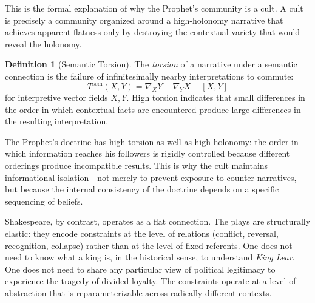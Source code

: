 \documentclass[12pt, oneside]{article}
\theoremstyle{plain}
\theoremstyle{definition}
\newtheorem{definition}[theorem]{Definition}
\theoremstyle{remark}
\begin{document}
This is the formal explanation of why the Prophet's community is a
cult. A cult is precisely a community organized around a high-holonomy
narrative that achieves apparent flatness only by destroying the
contextual variety that would reveal the holonomy.

\begin{definition}[Semantic Torsion]
The \emph{torsion} of a narrative under a semantic connection is the
failure of infinitesimally nearby interpretations to commute:
\[
  T^{\mathrm{sem}}(X, Y) = \nabla_X Y - \nabla_Y X - [X, Y]
\]
for interpretive vector fields $X, Y$. High torsion indicates that
small differences in the order in which contextual facts are
encountered produce large differences in the resulting interpretation.
\end{definition}

The Prophet's doctrine has high torsion as well as high holonomy:
the order in which information reaches his followers is rigidly
controlled because different orderings produce incompatible results.
This is why the cult maintains informational isolation---not merely
to prevent exposure to counter-narratives, but because the internal
consistency of the doctrine depends on a specific sequencing of
beliefs.

Shakespeare, by contrast, operates as a flat connection. The plays
are structurally elastic: they encode constraints at the level of
relations (conflict, reversal, recognition, collapse) rather than at
the level of fixed referents. One does not need to know what a
king is, in the historical sense, to understand \textit{King Lear}.
One does not need to share any particular view of political
legitimacy to experience the tragedy of divided loyalty. The
constraints operate at a level of abstraction that is
reparameterizable across radically different contexts.
\end{document}
